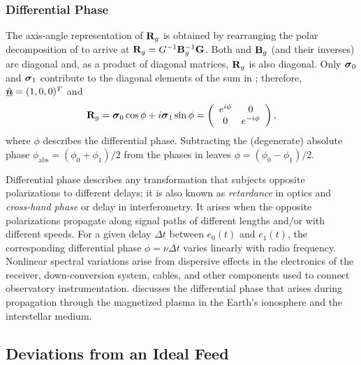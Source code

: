 
\subsubsection{Differential Phase}
\label{sec:differential_phase}

The axis-angle representation of ${\bf R}_g$ is obtained
%
by rearranging the polar decomposition of  to arrive at
${\bf R}_g = G^{-1} {\bf B}_g^{-1} {\bf G}$.  Both  and ${\bf B}_g$ (and their inverses) are diagonal
and, as a product of diagonal matrices,
${\bf R}_g$ is also diagonal.
%
Only $\mbox{\boldmath $\sigma$}_{0}$ and $\mbox{\boldmath $\sigma$}_{1}$ contribute to the diagonal elements of 
the sum in ; therefore, $\hat{\underline{\mbox{\boldmath $n$}}}=(1,0,0)^T$ and
%
\begin{equation}
	\label{eqn:diff_phase}
	{\bf R}_g = \mbox{\boldmath $\sigma$}_{0}\cos\phi + i \mbox{\boldmath $\sigma$}_{1}\sin\phi =
	\left( \begin{array}{cc}
		e^{i \phi} & 0 \\
		0   & e^{-i \phi}
	\end{array} \right),
\end{equation}
where $\phi$ describes the differential phase. Subtracting the (degenerate) absolute phase $\phi_\mathrm{abs}=(\phi_0+\phi_1)/2$ from the phases in  leaves $\phi=(\phi_0-\phi_1)/2.$


Differential phase describes any transformation that subjects opposite polarizations to different delays; it is also known as \emph{retardance} in optics and \emph{cross-hand phase} or delay in interferometry.
%
It arises when the opposite polarizations propagate along signal paths of different lengths and/or with different speeds.
%
For a given delay $\Delta t$ between $e_0(t)$ and $e_1(t)$, the corresponding differential phase $\phi = \nu \Delta t$ varies linearly with radio frequency.
%
Nonlinear spectral variations arise from dispersive effects in the electronics of the receiver, down-conversion system, cables, and other components used to connect observatory instrumentation.
%
 discusses the differential phase that arises during propagation through the magnetized plasma in the Earth's ionosphere and the interstellar medium.


\subsection{Deviations from an Ideal Feed}

